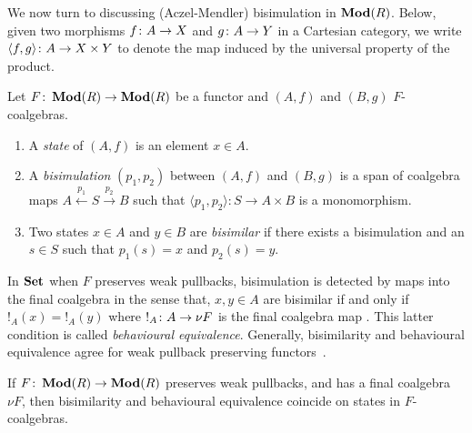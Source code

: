 \documentclass[runningheads]{llncs}
\begin{document}
We now turn to discussing (Aczel-Mendler) bisimulation in $\operatorname{\mathbf{Mod}}(R)$.  Below, given two morphisms $f \colon A \to X$ and $g\colon A \to Y$ in a Cartesian category, we write $\langle f, g \rangle \colon A  \to X\times Y$ to denote the map induced by the universal property of the product.
\begin{definition}
  Let $F \colon \operatorname{\mathbf{Mod}}(R) \to \operatorname{\mathbf{Mod}}(R)$ be a functor and $(A,f)$ and $(B,g)$ $F$-coalgebras.
\begin{enumerate}
\item
A \emph{state} of $(A, f)$ is an element $x \in A$.
\item
A \emph{bisimulation} $(p_1, p_2)$ between $(A,f)$ and $(B,g)$ is a span of coalgebra maps $A \xleftarrow{p_1} S \xrightarrow{p_2}B$ such that $\langle p_1, p_2 \rangle: S \to A\times B$ is a monomorphism.
\item
Two states  $x \in A$ and $y \in B$ are \emph{bisimilar} if there exists a bisimulation and an $s\in S$ such that $p_1(s) = x$ and $p_2(s)=y$.
\end{enumerate}
\end{definition}
In $\mathbf{Set}$ when $F$ preserves weak pullbacks, bisimulation is detected by maps into the final coalgebra in the sense that, $x,y \in A$ are bisimilar if and only if ${!_A}(x) = {!_A}(y)$ where $!_A \colon A \to \nu F$ is the final coalgebra map \cite[Theorem 9.3]{Rutten00}.
This latter condition is called \emph{behavioural equivalence}.
Generally, bisimilarity and behavioural equivalence agree for weak pullback preserving functors~\cite{Staton2011-Bisim}.
\begin{theoremE}
\label{thm:usual}
If $F \colon \operatorname{\mathbf{Mod}}(R)\to \operatorname{\mathbf{Mod}}(R)$ preserves weak pullbacks, and has a final coalgebra $\nu F$, then bisimilarity  and behavioural equivalence coincide on states in $F$-coalgebras.
\end{theoremE}
\end{document}
